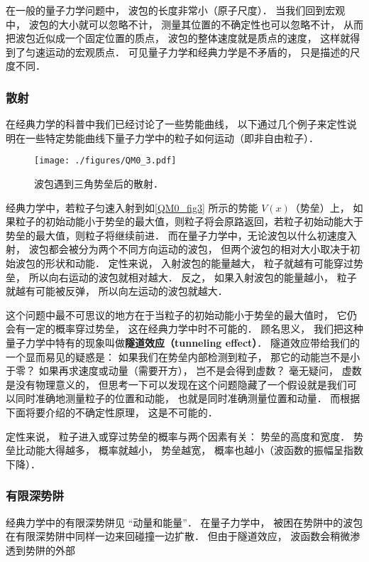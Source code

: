 在一般的量子力学问题中， 波包的长度非常小（原子尺度）． 当我们回到宏观中， 波包的大小就可以忽略不计， 测量其位置的不确定性也可以忽略不计， 从而把波包近似成一个固定位置的质点， 波包的整体速度就是质点的速度， 这样就得到了匀速运动的宏观质点． 可见量子力学和经典力学是不矛盾的， 只是描述的尺度不同．

\subsubsection{散射}
在经典力学的科普中我们已经讨论了一些势能曲线， 以下通过几个例子来定性说明在一些特定势能曲线下量子力学中的粒子如何运动（即非自由粒子）．

\begin{figure}[ht]
\centering
\texttt{[image: ./figures/QM0\_3.pdf]}
\caption{波包遇到三角势垒后的散射．} \label{QM0_fig3} %
\end{figure}

经典力学中，若粒子匀速入射到如\autoref{QM0_fig3} 所示的势能 $V(x)$（势垒）上， 如果粒子的初始动能小于势垒的最大值，则粒子将会原路返回，若粒子初始动能大于势垒的最大值，则粒子将继续前进． 而在量子力学中，无论波包以什么初速度入射， 波包都会被分为两个不同方向运动的波包， 但两个波包的相对大小取决于初始波包的形状和动能． 定性来说， 入射波包的能量越大， 粒子就越有可能穿过势垒， 所以向右运动的波包就相对越大． 反之， 如果入射波包的能量越小， 粒子就越有可能被反弹， 所以向左运动的波包就越大．

这个问题中最不可思议的地方在于当粒子的初始动能小于势垒的最大值时， 它仍会有一定的概率穿过势垒， 这在经典力学中时不可能的． 顾名思义， 我们把这种量子力学中特有的现象叫做\textbf{隧道效应（tunneling effect）}． 隧道效应带给我们的一个显而易见的疑惑是： 如果我们在势垒内部检测到粒子， 那它的动能岂不是小于零？ 如果再求速度或动量（需要开方）， 岂不是会得到虚数？ 毫无疑问， 虚数是没有物理意义的， 但思考一下可以发现在这个问题隐藏了一个假设就是我们可以同时准确地测量粒子的位置和动能， 也就是同时准确测量位置和动量． 而根据下面将要介绍的不确定性原理， 这是不可能的．

定性来说， 粒子进入或穿过势垒的概率与两个因素有关： 势垒的高度和宽度． 势垒比动能大得越多， 概率就越小， 势垒越宽， 概率也越小（波函数的振幅呈指数下降）．

\subsubsection{有限深势阱}
经典力学中的有限深势阱见 “动量和能量”． 在量子力学中， 被困在势阱中的波包在有限深势阱中同样一边来回碰撞一边扩散． 但由于隧道效应， 波函数会稍微渗透到势阱的外部

